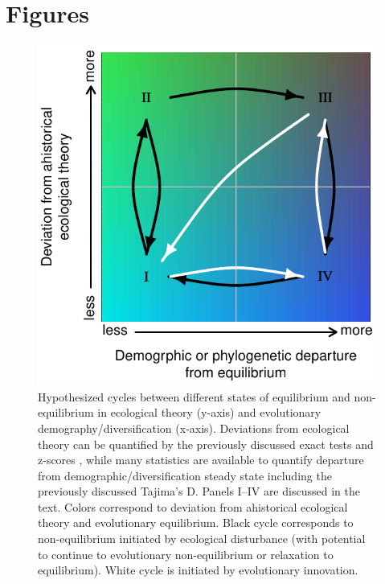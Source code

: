 \documentclass[12pt]{article}
\begin{document}
\pagebreak

\section*{Figures}

\begin{figure}[!hbp]
  \centering
  \includegraphics[scale=1]{fig_cycles.pdf}
  \caption{Hypothesized cycles between different states of equilibrium
    and non-equilibrium in ecological theory (y-axis) and evolutionary
    demography/diversification (x-axis). Deviations from ecological
    theory can be quantified by the previously discussed exact tests
    \citep{etienne2007} and z-scores \citep{meteR}, while many
    statistics are available to quantify departure from
    demographic/diversification steady state including the previously
    discussed Tajima's D. Panels I--IV are discussed in the text.
    Colors correspond to deviation from ahistorical ecological theory
    and evolutionary equilibrium.  Black cycle corresponds to
    non-equilibrium initiated by ecological disturbance (with
    potential to continue to evolutionary non-equilibrium or
    relaxation to equilibrium). White cycle is initiated by
    evolutionary innovation.}
  \label{fig:cycles}
\end{figure}
\end{document}
